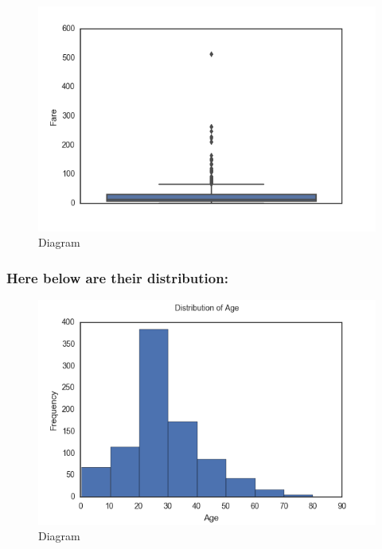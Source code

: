 \documentclass[11pt]{article}
\makeatletter
\def\maxwidth{\ifdim\Gin@nat@width>\linewidth\linewidth
    \else\Gin@nat@width\fi}
\let\Oldincludegraphics\includegraphics
\renewcommand{\includegraphics}[1]{\Oldincludegraphics[width=.8\maxwidth]{#1}}
\makeatother
\begin{document}
\begin{figure}
\centering
\includegraphics{boxplotFare.png}
\caption{Diagram}
\end{figure}

    \subsubsection{Here below are their
distribution:}\label{here-below-are-their-distribution}

    \begin{figure}
\centering
\includegraphics{AgeDistribution.png}
\caption{Diagram}
\end{figure}
\end{document}
